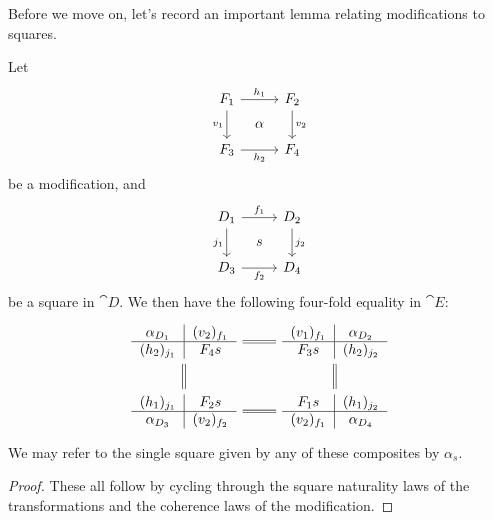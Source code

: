 \documentclass[DynamicalBook]{subfiles}
\begin{document}
Before we move on, let's record an important lemma relating modifications to squares.
\begin{lemma}
  Let
  \[
        \begin{tikzcd}[sep=tiny]
          F_1 \ar[dd, "v_1"'] \ar[rr, "h_1"] & & F_2
 \ar[dd, "v_2"] \\
           & \alpha & \\
          F_3 \ar[rr, "h_2"'] & & F_4
        \end{tikzcd}
  \]
  be a modification, and
  \[
        \begin{tikzcd}[sep=tiny]
          D_1 \ar[dd, "j_1"'] \ar[rr, "f_1"] & & D_2
 \ar[dd, "j_2"] \\
           & s & \\
          D_3 \ar[rr, "f_2"'] & & D_4
        \end{tikzcd}
  \]
  be a square in $\cat{D}$. We then have the following four-fold equality in $\cat{E}$:
  \[
    \begin{tikzcd}[ampersand replacement = \&]
  \begin{tabular}{c|c}
    $\alpha_{D_1}$ & $(v_2)_{f_1}$ \\ \hline
    $(h_2)_{j_1}$ & $F_4 s$
  \end{tabular}     \ar[r,
      equals] \ar[d, equals] \& \begin{tabular}{c|c}
    $(v_1)_{f_1}$ & $\alpha_{D_2}$ \\ \hline
    $F_3 s$ & $(h_2)_{j_2}$
  \end{tabular} \ar[d, equals]\\
   \begin{tabular}{c|c}
    $(h_1)_{j_1}$ & $F_2 s$ \\ \hline
  $\alpha_{D_3}$   & $(v_2)_{f_2}$
  \end{tabular}   \ar[r, equals] \&  \begin{tabular}{c|c}
    $F_1 s$ &  $(h_1)_{j_2}$ \\ \hline
    $(v_2)_{f_1}$ & $\alpha_{D_4}$
                                     \end{tabular}
\end{tikzcd}
  \]
 We may refer to the single square given by any of these composites by $\alpha_s$. 
\end{lemma}
\begin{proof}
These all follow by cycling through the square naturality laws of the
transformations and the coherence laws of the modification. 
\end{proof}
\end{document}
